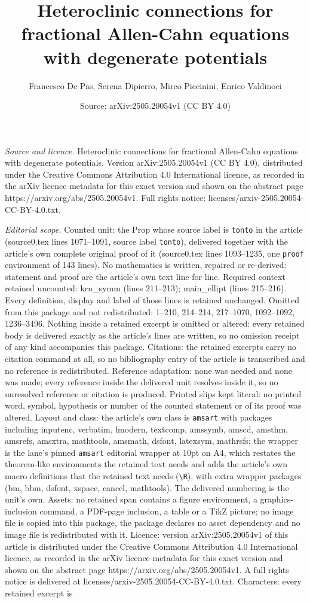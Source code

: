 \documentclass[10pt,a4paper]{amsart}
\title[Heteroclinic connections for fractional Allen-Cahn equations]{Heteroclinic connections for fractional Allen-Cahn equations with degenerate potentials}
\author{Francesco De Pas, Serena Dipierro, Mirco Piccinini, Enrico Valdinoci}
\date{Source: arXiv:2505.20054v1 (CC BY 4.0)}
\begin{document}
\maketitle

\noindent\emph{Source and licence.} Heteroclinic connections for fractional Allen-Cahn equations with degenerate potentials. Version arXiv:2505.20054v1 (CC BY 4.0), distributed under the Creative Commons Attribution 4.0 International licence, as recorded in the arXiv licence metadata for this exact version and shown on the abstract page https://arxiv.org/abs/2505.20054v1. Full rights notice: licenses/arxiv-2505.20054-CC-BY-4.0.txt.\par\smallskip

\noindent\textit{Editorial scope.} Counted unit: the Prop whose source label is \texttt{tonto} in the article (source0.tex lines 1071--1091, source label \texttt{tonto}), delivered together with the article's own complete original proof of it (source0.tex lines 1093--1235, one \texttt{proof} environment of 143 lines). No mathematics is written, repaired or re-derived: statement and proof are the article's own text line for line. Required context retained uncounted: krn\_symm (lines 211--213); main\_ellipt (lines 215--216). Every definition, display and label of those lines is retained unchanged. Omitted from this package and not redistributed: 1--210, 214--214, 217--1070, 1092--1092, 1236--3496. Nothing inside a retained excerpt is omitted or altered: every retained body is delivered exactly as the article's lines are written, so no omission receipt of any kind accompanies this package. Citations: the retained excerpts carry no citation command at all, so no bibliography entry of the article is transcribed and no reference is redistributed. Reference adaptation: none was needed and none was made; every reference inside the delivered unit resolves inside it, so no unresolved reference or citation is produced. Printed slips kept literal: no printed word, symbol, hypothesis or number of the counted statement or of its proof was altered. Layout and class: the article's own class is \texttt{amsart} with packages including inputenc, verbatim, lmodern, textcomp, amssymb, amscd, amsthm, amsrefs, amsxtra, mathtools, amsmath, dsfont, latexsym, mathrsfs; the wrapper is the lane's pinned \texttt{amsart} editorial wrapper at 10pt on A4, which restates the theorem-like environments the retained text needs and adds the article's own macro definitions that the retained text needs (\texttt{\textbackslash R}), with extra wrapper packages (bm, bbm, dsfont, xspace, cancel, mathtools). The delivered numbering is the unit's own. Assets: no retained span contains a figure environment, a graphics-inclusion command, a PDF-page inclusion, a table or a TikZ picture; no image file is copied into this package, the package declares no asset dependency and no image file is redistributed with it. Licence: version arXiv:2505.20054v1 of this article is distributed under the Creative Commons Attribution 4.0 International licence, as recorded in the arXiv licence metadata for this exact version and shown on the abstract page https://arxiv.org/abs/2505.20054v1. A full rights notice is delivered at licenses/arxiv-2505.20054-CC-BY-4.0.txt. Characters: every retained excerpt is 
\end{document}
